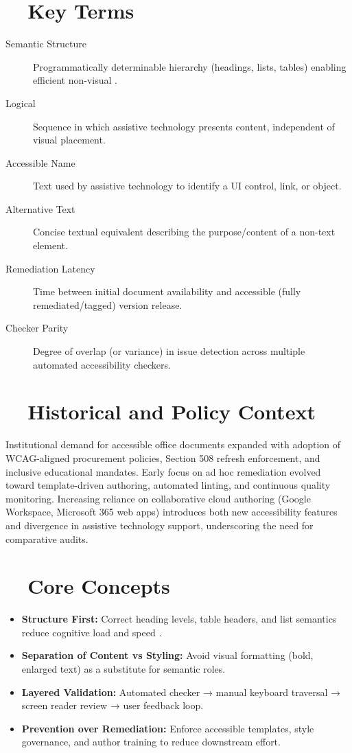 \section{~~Key Terms}\label{ch20:sec:key-terms}
\begin{description}
	\item[Semantic Structure] Programmatically determinable hierarchy (headings, lists, tables) enabling efficient non-visual .
	\item[Logical ] Sequence in which assistive technology presents content, independent of visual placement.
	\item[Accessible Name] Text used by assistive technology to identify a UI control, link, or object.
	\item[Alternative Text] Concise textual equivalent describing the purpose/content of a non-text element.
	\item[Remediation Latency] Time between initial document availability and accessible (fully remediated/tagged) version release.
	\item[Checker Parity] Degree of overlap (or variance) in issue detection across multiple automated accessibility checkers.
\end{description}

\section{~~Historical and Policy Context}\label{ch20:sec:historical-policy}
Institutional demand for accessible office documents expanded with adoption of WCAG-aligned procurement policies, Section 508 refresh enforcement, and inclusive educational mandates. Early focus on ad hoc remediation evolved toward template-driven authoring, automated linting, and continuous quality monitoring. Increasing reliance on collaborative cloud authoring (Google Workspace, Microsoft 365 web apps) introduces both new accessibility features and divergence in assistive technology support, underscoring the need for comparative audits.

\section{~~Core Concepts}\label{ch20:sec:core-concepts}
\begin{itemize}
	\item \textbf{Structure First:} Correct heading levels, table headers, and list semantics reduce cognitive load and speed .
	\item \textbf{Separation of Content vs Styling:} Avoid visual formatting (bold, enlarged text) as a substitute for semantic roles.
	\item \textbf{Layered Validation:} Automated checker → manual keyboard traversal → screen reader review → user feedback loop.
	\item \textbf{Prevention over Remediation:} Enforce accessible templates, style governance, and author training to reduce downstream effort.
\end{itemize}

